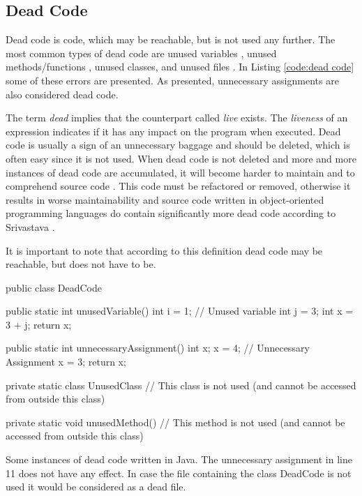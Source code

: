 \subsection{Dead Code}
\label{sub:dead code}

Dead code is code, which may be reachable, but is not used any further.
The most common types of dead code are unused variables \cite{Prahofer_2012}, unused methods/functions \cite{Romano_2016}, unused classes, and unused files \cite{Boomsma_2012}.
In Listing \ref{code:dead code} some of these errors are presented. As presented, unnecessary assignments are also considered dead code.


The term \emph{dead} implies that the counterpart called \emph{live} exists. 
The \emph{liveness} of an expression indicates if it has any impact on the program when executed.
Dead code is usually a sign of an unnecessary baggage and should be deleted, which is often easy since it is not used.
When dead code is not deleted and more and more instances of dead code are accumulated, it will become harder to maintain and to comprehend source code \cite{Romano_2020}. This code must be refactored or removed, otherwise it results in worse maintainability and 
source code written in object-oriented programming languages do contain significantly more dead code according to Srivastava \cite{Srivastava_1992}.


It is important to note that according to this definition dead code may be reachable, but does not have to be.



\begin{program}[h!]
	\begin{JavaCode}
		public class DeadCode {
			public static int unusedVariable() {
				int i = 1; // Unused variable
				int j = 3;
				int x = 3 + j;
				return x;
			}
			
			public static int unnecessaryAssignment() {
				int x;
				x = 4; // Unnecessary Assignment
				x = 3;
				return x;
			}
			
			private static class UnusedClass {
				// This class is not used (and cannot be accessed from outside this class)
			}
			
			private static void unusedMethod() {
				// This method is not used (and cannot be accessed from outside this class)
			}
	}\end{JavaCode}
	\caption{Some instances of dead code written in Java. The unnecessary assignment in line 11 does not have any effect. In case the file containing the class DeadCode is not used it would be considered as a dead file.}
	\label{code:dead code}
\end{program}

